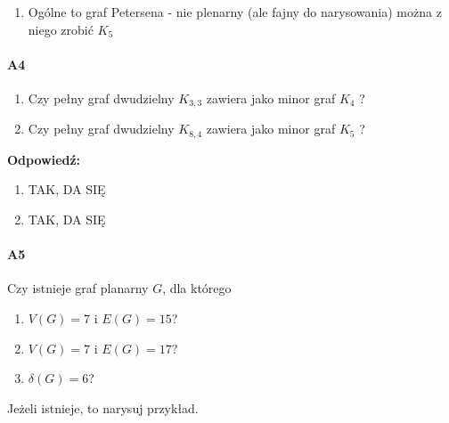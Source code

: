 \documentclass[a4paper,12pt]{article}
\theoremstyle{definition}%
\theoremstyle{definition}
\theoremstyle{problem}
\begin{document}
\begin{enumerate}[label=\alph*)]
\item Ogólne to graf Petersena - nie plenarny (ale fajny do narysowania) można z niego zrobić $K_5$
\begin{figure}[H]
\centering
{}
\end{figure}


\end{enumerate}

\paragraph{A4}
\begin{enumerate}[label=\alph*)]
\item Czy pełny graf dwudzielny $K_{3,3}$ zawiera jako minor graf $K_4$ ?
\item Czy pełny graf dwudzielny $K_{8,4}$ zawiera jako minor graf $K_5$ ?
\end{enumerate}
\textbf{Odpowiedź:} 
\begin{enumerate}[label=\alph*)]
\item TAK, DA SIĘ
\item TAK, DA SIĘ
\end{enumerate}

\paragraph{A5} Czy istnieje graf planarny $G$, dla którego
\begin{enumerate}[label=\alph*)]
\item  $V(G) = 7$ i $E(G) = 15$?
\item  $V(G) = 7$ i $E(G) = 17$?
\item  $\delta (G) = 6$?
\end{enumerate}
Jeżeli istnieje, to narysuj przykład.
\end{document}
